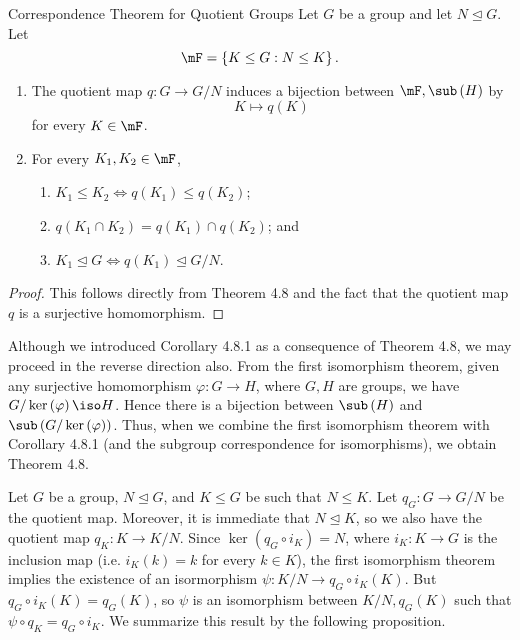\documentclass[pmath347]{subfiles}
\begin{document}
    \begin{cor}{Correspondence Theorem for Quotient Groups}
        Let $G$ be a group and let $N\trianglelefteq G$. Let
        \begin{equation*}
            \mF = \left\lbrace K\leq G: N\leq K \right\rbrace .
        \end{equation*}
        \begin{enumerate}
            \item The quotient map $q:G\to G /N$ induces a bijection between $\mF, \sub\left( H \right)$ by
                \begin{equation*}
                    K\mapsto q\left( K \right) 
                \end{equation*}
                for every $K\in\mF$.
            \item For every $K_1,K_2\in\mF$,
                \begin{enumerate}
                    \item $K_1\leq K_2\iff q\left( K_1 \right) \leq q\left( K_2 \right)$;
                    \item $q\left( K_1\cap K_2 \right) = q\left( K_1 \right) \cap q\left( K_2 \right)$; and
                    \item $K_1\trianglelefteq G\iff q\left( K_1 \right) \trianglelefteq G /N$.
                \end{enumerate}
        \end{enumerate}
    \end{cor}	

    \begin{proof}
        This follows directly from Theorem 4.8 and the fact that the quotient map $q$ is a surjective homomorphism.
    \end{proof}

    \np Although we introduced Corollary 4.8.1 as a consequence of Theorem 4.8, we may proceed in the reverse direction also. From the first isomorphism theorem, given any surjective homomorphism $\varphi:G\to H$, where $G,H$ are groups, we have $G /\ker\left( \varphi \right) \iso H$. Hence there is a bijection between $\sub\left( H \right)$ and $\sub\left( G /\ker\left( \varphi \right)  \right)$. Thus, when we combine the first isomorphism theorem with Corollary 4.8.1 (and the subgroup correspondence for isomorphisms), we obtain Theorem 4.8.

    \np Let $G$ be a group, $N\trianglelefteq G$, and $K\leq G$ be such that $N\leq K$. Let $q_G:G\to G /N$ be the quotient map. Moreover, it is immediate that $N\trianglelefteq K$, so we also have the quotient map $q_K:K\to K /N$. Since $\ker\left( q_G\circ i_K \right)= N$, where $i_K:K\to G$ is the inclusion map (i.e. $i_K\left( k \right) = k$ for every $k\in K$), the first isomorphism theorem implies the existence of an isormorphism $\psi: K /N\to q_G\circ i_K\left( K \right)$. But $q_G\circ i_K\left( K \right) = q_G\left( K \right)$, so $\psi$ is an isomorphism between $K /N, q_G\left( K \right)$ such that $\psi\circ q_K = q_G\circ i_K$. We summarize this result by the following proposition.
\end{document}
